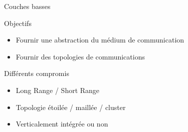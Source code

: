 
\begin{frame}{Couches basses}

  \begin{block}{Objectifs}
    \begin{itemize}
      \item Fournir une abstraction du médium de communication
      \item Fournir des topologies de communications
    \end{itemize}
  \end{block}

  \begin{block}{Différents compromis}
    \begin{itemize}
      \item Long Range / Short Range
      \item Topologie étoilée / maillée / cluster
      \item Verticalement intégrée ou non
    \end{itemize}
  \end{block}

\end{frame}

